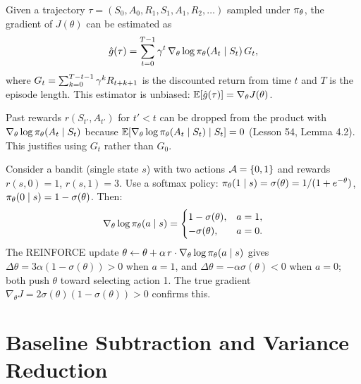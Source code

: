 \documentclass[11pt,a4paper]{article}
\begin{document}
\begin{keyresult}[title={REINFORCE Gradient Estimator}]
Given a trajectory $\tau = (S_0, A_0, R_1, S_1, A_1, R_2, \ldots)$
sampled under $\pi_\theta$, the gradient of $J(\theta)$ can be
estimated as
\[
  \hat{g}(\tau) = \sum_{t=0}^{T-1} \gamma^t\,
  \nabla_\theta \log \pi_\theta(A_t \mid S_t)\, G_t,
\]
where $G_t = \sum_{k=0}^{T-t-1} \gamma^k R_{t+k+1}$ is the
discounted return from time $t$ and $T$ is the episode length. This
estimator is unbiased: $\mathbb{E}[\hat{g}(\tau)] = \nabla_\theta J(\theta)$.
\end{keyresult}

\begin{remark}[Causality]
\label{rem:causality}
Past rewards $r(S_{t'}, A_{t'})$ for $t' < t$ can be dropped from the
product with $\nabla_\theta \log \pi_\theta(A_t \mid S_t)$ because
$\mathbb{E}[\nabla_\theta \log \pi_\theta(A_t \mid S_t) \mid S_t] = 0$
(Lesson 54, Lemma 4.2). This justifies using $G_t$ rather than $G_0$.
\end{remark}

\begin{example}
\label{ex:bandit}
Consider a bandit (single state $s$) with two actions
$\mathcal{A} = \{0, 1\}$ and rewards $r(s,0) = 1$, $r(s,1) = 3$. Use a
softmax policy: $\pi_\theta(1 \mid s) = \sigma(\theta) = 1/(1+e^{-\theta})$,
$\pi_\theta(0 \mid s) = 1 - \sigma(\theta)$. Then:
\[
  \nabla_\theta \log \pi_\theta(a \mid s)
  = \begin{cases}
    1 - \sigma(\theta), & a = 1, \\
    -\sigma(\theta), & a = 0.
  \end{cases}
\]
The REINFORCE update $\theta \leftarrow \theta + \alpha\, r \cdot
\nabla_\theta \log \pi_\theta(a \mid s)$ gives
$\Delta\theta = 3\alpha(1-\sigma(\theta)) > 0$ when $a=1$, and
$\Delta\theta = -\alpha\sigma(\theta) < 0$ when $a=0$; both push
$\theta$ toward selecting action 1. The true gradient
$\nabla_\theta J = 2\sigma(\theta)(1-\sigma(\theta)) > 0$ confirms this.
\end{example}

\section{Baseline Subtraction and Variance Reduction}
\end{document}
